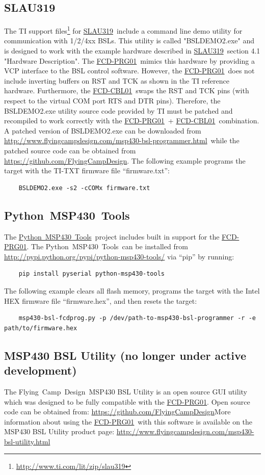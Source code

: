 \documentclass[10pt,letterpaper]{datasheet}
\newcommand{\PIDNOLINK}{FCD\nobreakdash-PRG01}
\newcommand{\PID}{\href{http://www.flyingcampdesign.com/msp430-bsl-programmer.html}{\PIDNOLINK}}
\newcommand{\PIDURL}{\href{http://www.flyingcampdesign.com/msp430-bsl-programmer.html}{http://www.flyingcampdesign.com/msp430-bsl-programmer.html}}
\newcommand{\PIDCBLNOLINK}{FCD-CBL01}
\newcommand{\PIDCBL}{\href{http://www.flyingcampdesign.com/msp430-bsl-programmer.html}{\PIDCBLNOLINK}}
\newcommand{\fcd}{Flying~Camp~Design}
\newcommand{\pmt}{Python~MSP430~Tools}
\newcommand{\pmturl}{\href{https://launchpad.net/python-msp430-tools/}{\pmt}}
\newcommand{\SLAUNOLINK}{SLAU319}
\newcommand{\SLAUPDF}{\href{http://www.ti.com/lit/pdf/SLAU319}{\SLAUNOLINK}}
\newcommand{\SLAUZIPURL}{\href{http://www.ti.com/lit/zip/slau319}{http://www.ti.com/lit/zip/slau319}}
\newcommand{\githuburl}{\href{http://github.com/FlyingCampDesign}{https://github.com/FlyingCampDesign}}
\newcommand{\fcdbslutility}{\href{http://www.flyingcampdesign.com/msp430-bsl-utility.html}{http://www.flyingcampdesign.com/msp430-bsl-utility.html}}
\begin{document}
\subsection*{\SLAUNOLINK}
The TI support files\footnote{\SLAUZIPURL} for \SLAUPDF\ include a command line demo utility for communication with 1/2/4xx BSLs.  This utility is called "BSLDEMO2.exe" and is designed to work with the example hardware described in \SLAUPDF\ section 4.1 "Hardware Description".  The \PID\ mimics this hardware by providing a VCP interface to the BSL control software.  However, the \PID\ does not include inverting buffers on RST and TCK as shown in the TI reference hardware.  Furthermore, the \PIDCBL\ swaps the RST and TCK pins (with respect to the virtual COM port RTS and DTR pins).  Therefore, the BSLDEMO2.exe utility source code provided by TI must be patched and recompiled to work correctly with the \PID\ + \PIDCBL\ combination.  A patched version of BSLDEMO2.exe can be downloaded from \PIDURL\ while the patched source code can be obtained from \githuburl.  The following example programs the target with the TI-TXT firmware file ``firmware.txt'':
\begin{verbatim}
    BSLDEMO2.exe -s2 -cCOMx firmware.txt
\end{verbatim}

\subsection*{\pmt}
The \pmturl\ project includes built in support for the \PID.
The \pmt\ can be installed from \href{http://pypi.python.org/pypi/python-msp430-tools/}{http://pypi.python.org/pypi/python-msp430-tools/} via ``pip'' by running:
\begin{verbatim}
    pip install pyserial python-msp430-tools
\end{verbatim}
The following example clears all flash memory, programs the target with the Intel HEX firmware file ``firmware.hex'', and then resets the target:
\begin{verbatim}
    msp430-bsl-fcdprog.py -p /dev/path-to-msp430-bsl-programmer -r -e path/to/firmware.hex
\end{verbatim}

\subsection*{MSP430 BSL Utility (no longer under active development)}
The \fcd\ MSP430 BSL Utility is an open source GUI utility which was designed to be fully compatible with the \PID. Open source code can be obtained from: \githuburl \newline More information about using the \PID\ with this software is available on the MSP430 BSL Utility product page: \fcdbslutility
\end{document}

